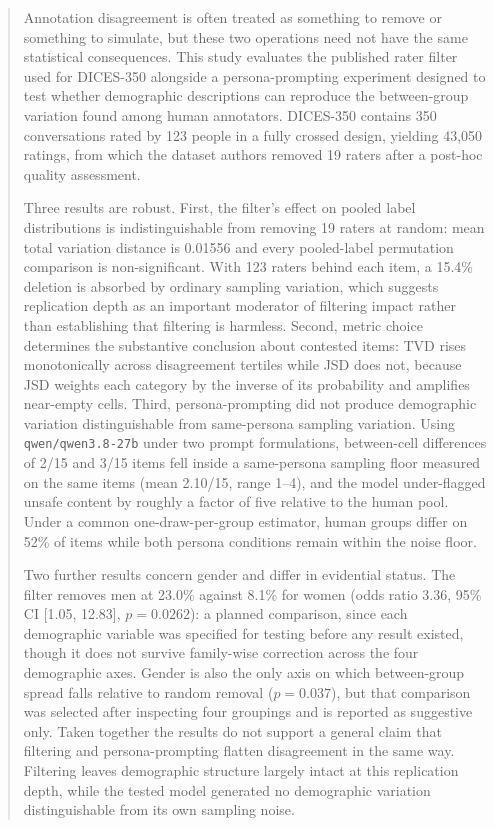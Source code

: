 \documentclass[11pt,a4paper]{article}
\begin{document}
\begin{abstract}
\noindent
Annotation disagreement is often treated as something to remove or something to simulate, but
these two operations need not have the same statistical consequences. This study evaluates the
published rater filter used for DICES-350 alongside a persona-prompting experiment designed to
test whether demographic descriptions can reproduce the between-group variation found among human
annotators. DICES-350 contains 350 conversations rated by 123 people in a fully crossed design,
yielding 43,050 ratings, from which the dataset authors removed 19 raters after a post-hoc
quality assessment.

Three results are robust. First, the filter's effect on pooled label distributions is
indistinguishable from removing 19 raters at random: mean total variation distance is 0.01556 and
every pooled-label permutation comparison is non-significant. With 123 raters behind each item, a 15.4\%
deletion is absorbed by ordinary sampling variation, which suggests replication depth as an
important moderator of filtering impact rather than establishing that filtering is harmless.
Second, metric choice determines the substantive conclusion about contested items: TVD rises
monotonically across disagreement tertiles while JSD does not, because JSD weights each category
by the inverse of its probability and amplifies near-empty cells. Third, persona-prompting did not produce
demographic variation distinguishable from same-persona sampling variation. Using \texttt{qwen/qwen3.8-27b} under two prompt
formulations, between-cell differences of 2/15 and 3/15 items fell inside a same-persona sampling
floor measured on the same items (mean 2.10/15, range 1--4), and the model under-flagged unsafe
content by roughly a factor of five relative to the human pool. Under a common
one-draw-per-group estimator, human groups differ on 52\% of items while both persona conditions
remain within the noise floor.

Two further results concern gender and differ in evidential status. The filter removes men at
23.0\% against 8.1\% for women (odds ratio 3.36, 95\% CI [1.05, 12.83], $p = 0.0262$): a planned
comparison, since each demographic variable was specified for testing before any result existed,
though it does not survive family-wise correction across the four demographic axes. Gender is also
the only axis on which between-group spread falls relative to random removal ($p = 0.037$), but
that comparison was selected after inspecting four groupings and is reported as suggestive only.
Taken together the results do not support a general claim that filtering and persona-prompting
flatten disagreement in the same way. Filtering leaves demographic structure largely intact at
this replication depth, while the tested model generated no demographic variation
distinguishable from its own sampling noise.
\end{abstract}
\end{document}
